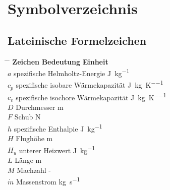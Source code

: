 \chapter*{Symbolverzeichnis}

\section*{Lateinische Formelzeichen}

\begin{tabbing}
	\hspace*{3cm} \= \hspace*{8cm} \= \hspace*{2cm}\kill
	\textbf{Zeichen} \> \textbf{Bedeutung} 				\>	\textbf{Einheit}		\\[5mm]
	$a$         \>  spezifische Helmholtz-Energie       \> \si{\J\per\kg}	 \\
    $c_p$       \>  spezifische isobare Wärmekapazität  \>  \si{\J\per\kg\per\K}	 \\
    $c_v$       \>  spezifische isochore Wärmekapazität \>  \si{\J\per\kg\per\K} \\
    $D$         \>  Durchmesser                         \>  \si{\m}  \\
    $F$         \>  Schub                               \>  \si{\N}  \\
    $h$         \>  spezifische Enthalpie               \>  \si{\J\per\kg} \\
    $H$         \>  Flughöhe                            \>  \si{\m} \\
    $H_u$       \>  unterer Heizwert                    \>  \si{\J\per\kg} \\
    $L$         \>  Länge                               \>  \si{\m}   \\
    $M$        \>  Machzahl                            \>  -   \\
    $\dot{m}$   \>  Massenstrom                         \>  \si{\kg\per\s} \\

\end{tabbing}

